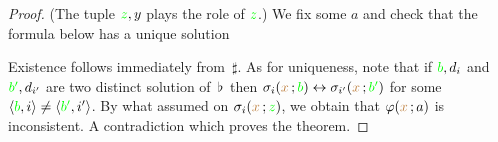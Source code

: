 \begin{proof}

(The tuple ${\color{green} z},y$ plays the role of ${\color{green} z}$.)  We fix some $a$ and check that the formula below has a unique solution


Existence follows immediately from $\,\sharp$.
As for uniqueness, note that if ${\color{green} b},d_i$ and ${\color{green} b'},d_{i'}$ are two distinct solution of $\,\flat\,$ then $\sigma_i({\color{brown} x}\,;{\color{green} b})\leftrightarrow\sigma_{i'}({\color{brown} x}\,;{\color{green} b'})$ for some $\langle{\color{green}b},i\rangle\neq\langle{\color{green}b'},i'\rangle$.
By what assumed on $\sigma_i({\color{brown} x}\,;{\color{green} z})$, we obtain that $\varphi({\color{brown} x}\,;a)$ is inconsistent.
A contradiction which proves the theorem.
\end{proof}